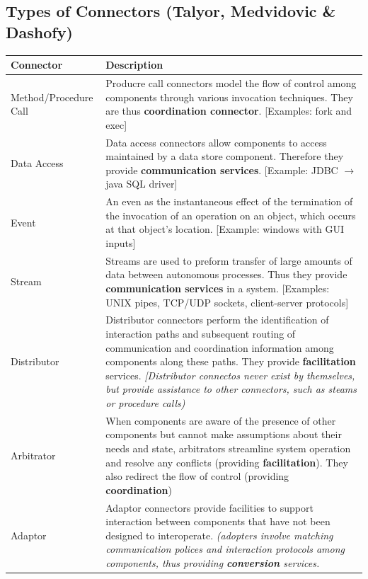 \documentclass[a4paper]{article}
\begin{document}
\subsection{Types of Connectors (Talyor, Medvidovic \& Dashofy)}
\begin{table}[H]
\begin{tabular}{|l|p{10cm}|}
\hline
Connector & Description\\
\hline
Method/Procedure Call & Producre call connectors model the flow of control among components through various invocation techniques. They are thus \textbf{coordination connector}. [Examples: fork and exec]\\
\hline
Data Access & Data access connectors allow components to access maintained by a data store component. Therefore they provide \textbf{communication services}. [Example: JDBC $\rightarrow$ java SQL driver]\\
\hline
Event & An even as the instantaneous effect of the termination of the invocation of an operation on an object, which occurs at that object's location. [Example: windows with GUI inputs] \\
\hline
Stream & Streams are used to preform transfer of large amounts of data between autonomous processes. Thus they provide \textbf{communication services} in a system. [Examples: UNIX pipes, TCP/UDP sockets, client-server protocols]\\
\hline
Distributor & Distributor connectors perform the identification of interaction paths and subsequent routing of communication and coordination information among components along these paths. They provide \textbf{facilitation} services. \textit{[Distributor connectos never exist by themselves, but provide assistance to other connectors, such as steams or procedure calls)}\\
\hline
Arbitrator & When components are aware of the presence of other components but cannot make assumptions about their needs and state, arbitrators streamline system operation and resolve any conflicts (providing \textbf{facilitation}). They also redirect the flow of control (providing \textbf{coordination}) \\
\hline
Adaptor & Adaptor connectors provide facilities to support interaction between components that have not been designed to interoperate. \textit{(adopters involve matching communication polices and interaction protocols among components, thus providing \textbf{conversion} services.}\\
\hline
\end{tabular}
\end{table}
\newpage
\end{document}
